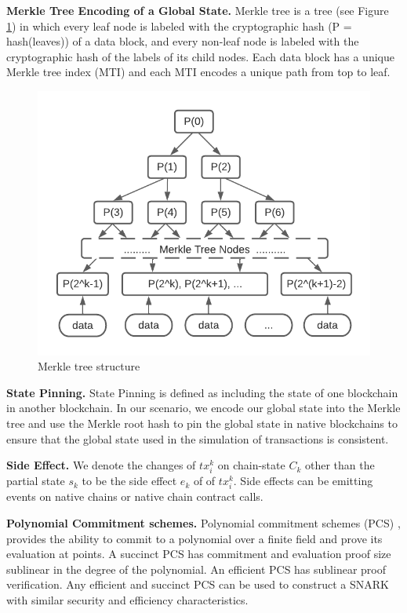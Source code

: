 \documentclass[pageno]{jpaper}
\begin{document}
\smallskip\noindent\textbf{Merkle Tree Encoding of a Global State.}
Merkle tree \cite{becker2008merkle} is a tree (see Figure \ref{merkle-tree}) in which every leaf node is labeled with the cryptographic hash (P = hash(leaves)) of a data block, and every non-leaf node is labeled with the cryptographic hash of the labels of its child nodes. Each data block has a unique Merkle tree index (MTI) and each MTI encodes a unique path from top to leaf.\\

\begin{figure}[!ht]
\centerline{
\includegraphics[scale=0.6]{merkle-tree}}
\caption{Merkle tree structure}\label{merkle-tree}
\end{figure}

\smallskip\noindent\textbf{State Pinning.}
State Pinning \cite {robinson2019anonymous} is defined as including the state of one blockchain in another blockchain. In our scenario, we encode our global state into the Merkle tree and use the Merkle root hash to pin the global state in native blockchains to ensure that the global state used in the simulation of transactions is consistent.

\smallskip\noindent\textbf{Side Effect.}
We denote the changes of $tx_i^k$ on chain-state $C_k$ other than the partial state $s_k$ to be the side effect $e_k$ of of $tx_i^k$. Side effects can be emitting events on native chains or native chain contract calls.

\smallskip\noindent\textbf{Polynomial Commitment schemes.}
Polynomial commitment schemes (PCS) \cite{boneh2020halo-pcs,boneh2020efficient-pcs,kate2010polynomial-pcs}, provides the ability to commit to a polynomial over a finite field and prove its evaluation at points. A succinct PCS has commitment and evaluation proof size sublinear in the degree of the polynomial. An efficient PCS has sublinear proof verification. Any efficient and succinct PCS can be used to construct a SNARK \cite{mayer2016zk} with similar security and efficiency characteristics.
\end{document}
